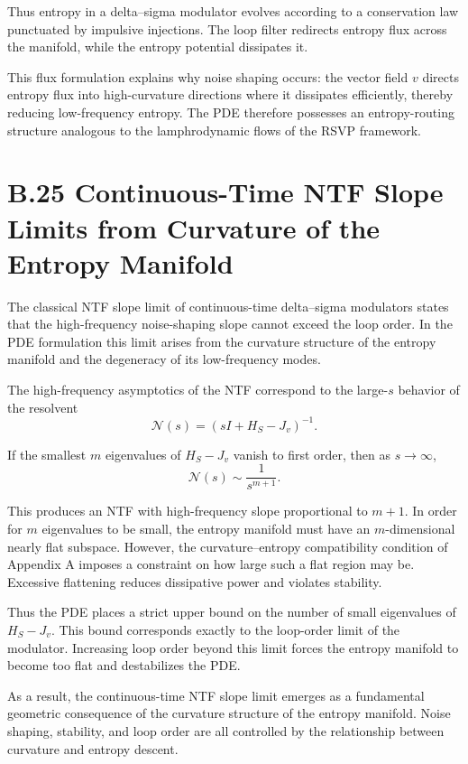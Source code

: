 Thus entropy in a delta–sigma modulator evolves according to a conservation law punctuated by impulsive injections. The loop filter redirects entropy flux across the manifold, while the entropy potential dissipates it.

This flux formulation explains why noise shaping occurs: the vector field \(v\) directs entropy flux into high-curvature directions where it dissipates efficiently, thereby reducing low-frequency entropy. The PDE therefore possesses an entropy-routing structure analogous to the lamphrodynamic flows of the RSVP framework.

\section{B.25 Continuous-Time NTF Slope Limits from Curvature of the Entropy Manifold}

The classical NTF slope limit of continuous-time delta–sigma modulators states that the high-frequency noise-shaping slope cannot exceed the loop order. In the PDE formulation this limit arises from the curvature structure of the entropy manifold and the degeneracy of its low-frequency modes.

The high-frequency asymptotics of the NTF correspond to the large-\(s\) behavior of the resolvent
\[
\mathcal{N}(s) = (sI + H_{S} - J_{v})^{-1}.
\]

If the smallest \(m\) eigenvalues of \(H_{S} - J_{v}\) vanish to first order, then as \(s\to\infty\),
\[
\mathcal{N}(s) \sim \frac{1}{s^{m+1}}.
\]

This produces an NTF with high-frequency slope proportional to \(m+1\). In order for \(m\) eigenvalues to be small, the entropy manifold must have an \(m\)-dimensional nearly flat subspace. However, the curvature–entropy compatibility condition of Appendix A imposes a constraint on how large such a flat region may be. Excessive flattening reduces dissipative power and violates stability.

Thus the PDE places a strict upper bound on the number of small eigenvalues of \(H_{S} - J_{v}\). This bound corresponds exactly to the loop-order limit of the modulator. Increasing loop order beyond this limit forces the entropy manifold to become too flat and destabilizes the PDE.

As a result, the continuous-time NTF slope limit emerges as a fundamental geometric consequence of the curvature structure of the entropy manifold. Noise shaping, stability, and loop order are all controlled by the relationship between curvature and entropy descent.

